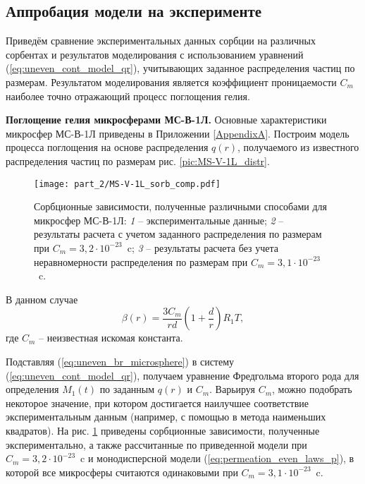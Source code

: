 \subsection{Аппробация модели на эксперименте}
\label{section_2_3_4}

Приведём сравнение экспериментальных данных сорбции на различных сорбентах и результатов моделирования с использованием  уравнений (\ref{eq:uneven_cont_model_qr}), учитывающих заданное распределения частиц по размерам. Результатом моделирования является коэффициент проницаемости $C_m$ наиболее точно отражающий процесс поглощения гелия. 


\textbf{Поглощение гелия микросферами МС-В-1Л.} Основные характеристики микросфер МС-В-1Л приведены в Приложении \ref{AppendixA}. Построим модель процесса поглощения на основе распределения $q(r)$, получаемого из известного распределения частиц по размерам рис. \ref{pic:MS-V-1L_distr}.

\begin{figure}[h]
		\centering
		\texttt{[image: part\_2/MS-V-1L\_sorb\_comp.pdf]}\\
		\caption{Сорбционные зависимости, полученные различными способами для микросфер МС-В-1Л:
		\textit{1} -- экспериментальные данные;
		\textit{2} -- результаты расчета с учетом заданного распределения по размерам при $C_m=3,2\cdot 10^{-23}$~c;
		\textit{3} -- результаты расчета без учета неравномерности распределения по размерам при $C_m=3,1\cdot 10^{-23}$~c.}
		\label{pic:MS-V-1L_sorp_comp}
\end{figure}

В данном случае 
\begin{equation}
\label{eq:uneven_br_microsphere}
\beta(r) = \frac{3 C_m}{r d}\left(1+\displaystyle\frac{d}{r}\right) R_1 T,
\end{equation}
где $C_m$ -- неизвестная искомая константа. 

Подставляя (\ref{eq:uneven_br_microsphere}) в систему (\ref{eq:uneven_cont_model_qr}), получаем уравнение Фредгольма второго рода для определения $M_1(t)$ по заданным $q(r)$ и $C_m$. Варьируя $C_m$, можно подобрать некоторое значение, при котором достигается наилучшее соответствие экспериментальным данным (например, с помощью в метода наименьших квадратов). На рис. \ref{pic:MS-V-1L_sorp_comp}
приведены сорбционные зависимости, полученные экспериментально, а также рассчитанные по приведенной модели при $C_m=3,2\cdot 10^{-23}$~c и монодисперсной модели  (\ref{eq:permeation_even_laws_p}), в которой все микросферы считаются одинаковыми при $C_m = 3,1\cdot 10^{-23}$~c.

